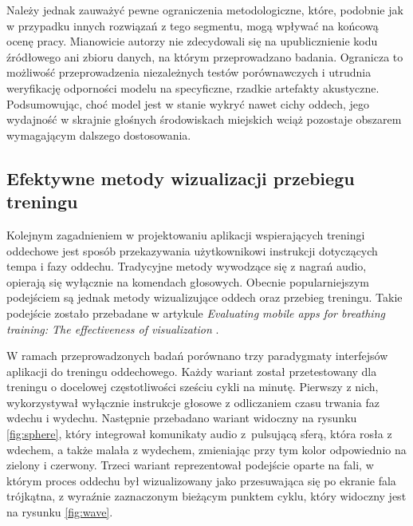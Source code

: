 Należy jednak zauważyć pewne ograniczenia metodologiczne, które, podobnie jak w przypadku innych rozwiązań z tego segmentu, mogą wpływać na końcową ocenę pracy. Mianowicie autorzy nie zdecydowali się na upublicznienie kodu źródłowego ani zbioru danych, na którym przeprowadzano badania. Ogranicza to możliwość przeprowadzenia niezależnych testów porównawczych i utrudnia weryfikację odporności modelu na specyficzne, rzadkie artefakty akustyczne. Podsumowując, choć model jest w stanie wykryć nawet cichy oddech, jego wydajność w skrajnie głośnych środowiskach miejskich wciąż pozostaje obszarem wymagającym dalszego dostosowania.

\subsection{Efektywne metody wizualizacji przebiegu treningu}
Kolejnym zagadnieniem w projektowaniu aplikacji wspierających treningi oddechowe jest sposób przekazywania użytkownikowi instrukcji dotyczących tempa i fazy oddechu. Tradycyjne metody wywodzące się z nagrań audio, opierają się wyłącznie na komendach głosowych. Obecnie popularniejszym podejściem są jednak metody wizualizujące oddech oraz przebieg treningu. Takie podejście zostało przebadane w artykule \textit{Evaluating mobile apps for breathing training: The effectiveness of visualization} \cite{chittaro2014evaluating}.

W ramach przeprowadzonych badań porównano trzy paradygmaty interfejsów aplikacji do treningu oddechowego. Każdy wariant został przetestowany dla treningu o docelowej częstotliwości sześciu cykli na minutę. Pierwszy z nich, wykorzystywał wyłącznie instrukcje głosowe z odliczaniem czasu trwania faz wdechu i wydechu. Następnie przebadano wariant widoczny na rysunku \ref{fig:sphere}, który integrował komunikaty audio z~pulsującą sferą, która rosła z wdechem, a także malała z wydechem, zmieniając przy tym kolor odpowiednio na zielony i czerwony. Trzeci wariant reprezentował podejście oparte na fali, w którym proces oddechu był wizualizowany jako przesuwająca się po ekranie fala trójkątna, z wyraźnie zaznaczonym bieżącym punktem cyklu, który widoczny jest na rysunku \ref{fig:wave}.

